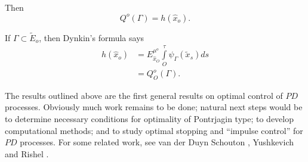  Then 
 $$
 Q^o(\Gamma) = h(\hat{x}_o).
 $$

\setcounter{exam}{0} 
\begin{exam}%
   If $\Gamma \subset \tilde{E}_o$, then Dynkin's formula says
   \begin{align*}
     h (\hat{x}_o) &= E^{\mu^o}_{\hat{x}_O} \int\limits_{O}^\tau
     \psi_\Gamma(\tilde{x}_s) ds\\ 
     &= Q^o_O(\Gamma).
   \end{align*}
\end{exam} 
 
 The results outlined above are the first general results on optimal
 control of $PD$ processes. Obviously much work remains to be done;
 natural next steps would be to determine necessary conditions for
 optimality of Pontrjagin type; to develop computational methods; and
 to study optimal stopping and ``impulse control'' for $PD$
 processes. For some related work, see van der Duyn Schouton \cite{key29},
 Yushkevich \cite{key30} and Rishel \cite{key31}.  
 


